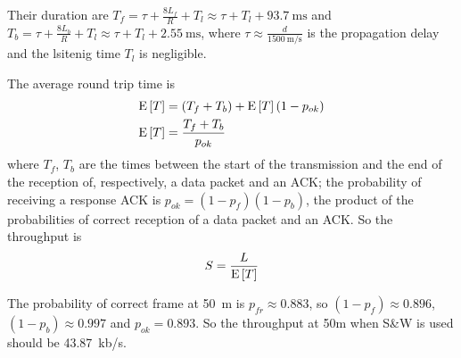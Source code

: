 Their duration are $T_f = \tau + \frac{8L_f}{R} + T_l \approx \tau +
T_l + \SI{93.7}{\ms}$ and $T_b = \tau + \frac{8L_b}{R} +T_l \approx
\tau + T_l + \SI{2.55}{\ms}$, where $\tau \approx
\frac{d}{\SI{1500}{\m\per\s}}$ is the propagation delay and the
lsitenig time $T_l$ is negligible.

The average round trip time is
\begin{align}
  \operatorname{E}\left[T\right] &= (T_f + T_b) + \operatorname{E}\left[T\right](1-p_{ok}) \\
  \operatorname{E}\left[T\right] &= \frac{T_f + T_b}{p_{ok}}
\end{align}
where $T_f$, $T_b$ are the times between the start of the transmission
and the end of the reception of, respectively, a data packet and an
ACK; the probability of receiving a response ACK is $p_{ok} =
(1-p_f)(1-p_b)$, the product of the probabilities of correct reception
of a data packet and an ACK.
%
So the throughput is
\begin{equation}
  S = \frac{L}{\operatorname{E}\left[T\right]}
\end{equation}

The probability of correct frame at \SI{50}{\m} is $p_{fr} \approx
0.883$, so $(1-p_f) \approx 0.896$, $(1-p_b) \approx 0.997$ and
$p_{ok} = 0.893$. So the throughput at 50m when S\&W is used should be
\SI{43.87}{kb/s}.
